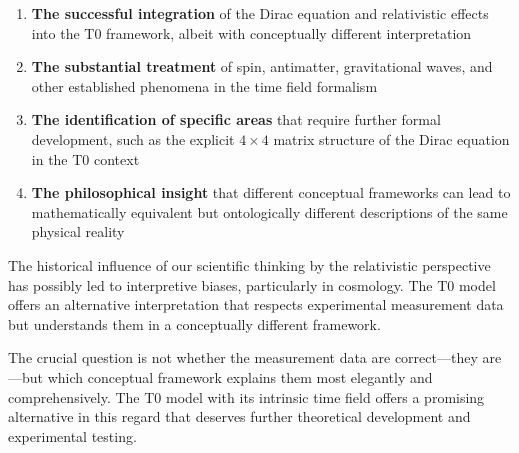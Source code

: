 \documentclass[12pt,a4paper]{article}
\begin{document}
	\begin{enumerate}
		\item \textbf{The successful integration} of the Dirac equation and relativistic effects into the T0 framework, albeit with conceptually different interpretation
		
		\item \textbf{The substantial treatment} of spin, antimatter, gravitational waves, and other established phenomena in the time field formalism
		
		\item \textbf{The identification of specific areas} that require further formal development, such as the explicit $4 \times 4$ matrix structure of the Dirac equation in the T0 context
		
		\item \textbf{The philosophical insight} that different conceptual frameworks can lead to mathematically equivalent but ontologically different descriptions of the same physical reality
	\end{enumerate}
	
	The historical influence of our scientific thinking by the relativistic perspective has possibly led to interpretive biases, particularly in cosmology. The T0 model offers an alternative interpretation that respects experimental measurement data but understands them in a conceptually different framework.
	
	The crucial question is not whether the measurement data are correct—they are—but which conceptual framework explains them most elegantly and comprehensively. The T0 model with its intrinsic time field offers a promising alternative in this regard that deserves further theoretical development and experimental testing.
	
\end{document}
